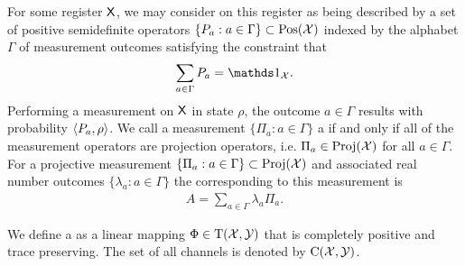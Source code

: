 For some register $\mathsf{X}$, we may consider  on this register as being described by a set of positive semidefinite operators $\{P_a : a \in \Gamma \} \subset \mathrm{Pos}(\mathcal{X})$ indexed by the alphabet $\Gamma$ of measurement outcomes satisfying the constraint that 
\begin{align}
	\sum_{a \in \Gamma} P_a = \I_{\X}.
\end{align}
Performing a measurement on $\mathsf{X}$ in state $\rho$, the outcome $a \in \Gamma$ results with probability $\langle P_a , \rho\rangle$. We call a measurement $\{\Pi_a : a \in \Gamma \}$ a  if and only if all of the measurement operators are projection operators, i.e. $\Pi_a \in \mathrm{Proj}(\mathcal{X})$ for all $a \in \Gamma$. For a projective measurement $\{\Pi_a : a \in \Gamma \} \subset \mathrm{Proj}(\mathcal{X})$ and associated real number outcomes $\{ \lambda_a : a \in \Gamma \}$ the  corresponding to this measurement is 
\begin{align}
	A = \sum_{a \in \Gamma} \lambda_a \Pi_a.
\end{align}

%

We define a  as a linear mapping $\Phi \in \mathrm{T}(\mathcal{X},\mathcal{Y})$ that is completely positive and trace preserving. The set of all channels is denoted by $\mathrm{C}(\mathcal{X},\mathcal{Y})$.

